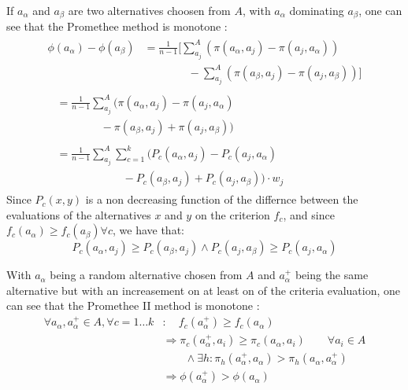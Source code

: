 If $a_{\alpha}$ and $a_\beta$ are two alternatives choosen from $A$, with $a_{\alpha}$ dominating $a_\beta$, one can see that the Promethee method is monotone :
\begin{align}
    \label{eq:monotone_PII}
        \begin{split}
            \phi (a_{\alpha}) - \phi (a_\beta) &= \frac{1}{n-1} \Big[ \sum\limits_{a_j}^A (\pi(a_{\alpha} ,a_j) - \pi(a_j,a_{\alpha}) ) \\
                & \qquad \qquad - \sum\limits_{a_j}^A (\pi(a_\beta,a_j) - \pi(a_j,a_\beta) ) \Big] 
        \end{split}\\
        \begin{split}
        &= \frac{1}{n-1} \sum\limits_{a_j}^A \big(  \pi (a_{\alpha} ,a_j) - \pi(a_j,a_{\alpha}) \\
        & \qquad \qquad -  \pi(a_\beta,a_j) + \pi(a_j,a_\beta) \big) 
        \end{split}\\
        \begin{split}
        &=  \frac{1}{n-1} \sum\limits_{a_j}^A \sum\limits_{c=1}^k \big( P_c(a_{\alpha},a_j) - P_c(a_j,a_{\alpha}) \\
        & \qquad \qquad \qquad - P_c(a_\beta,a_j) + P_c(a_j,a_\beta) \big) \cdot w_j
        \end{split}
\end{align}
Since $P_c(x,y)$ is a non decreasing function of the differnce between the evaluations of the alternatives $x$ and $y$ on the criterion $f_c$, and since $f_c(a_{\alpha}) \ge f_c(a_\beta) \forall c$, we have that:
\begin{equation}
    P_c(a_{\alpha},a_j) \ge  P_c(a_\beta,a_j)  \land  P_c(a_j,a_\beta)    \ge  P_c(a_j,a_{\alpha}) 
    \label{eq:monotone_PII_end}
\end{equation}


With $a_\alpha$ being a random alternative chosen from $A$ and $a_\alpha ^+$ being the same alternative but with an increasement on at least on of the criteria evaluation, one can see that the Promethee II method is monotone :
\begin{equation}
\begin{split}
    \forall a_\alpha, a_\alpha^+ \in A, \forall c=1\dots k &: \quad f_c(a_\alpha ^+) \ge f_c(a_\alpha) \\
     & \Rightarrow \pi _c(a_\alpha ^+,a_i) \ge \pi _c(a_\alpha,a_i)\qquad \forall a_i \in A\\
     & \qquad \land \exists h : \pi _h(a_\alpha ^+, a_\alpha) > \pi _h(a_\alpha, a_\alpha ^+) \\
     & \Rightarrow \phi (a_\alpha ^+) > \phi(a_\alpha) 
\end{split}
    \label{eqn:monotone_promethee}
\end{equation}


